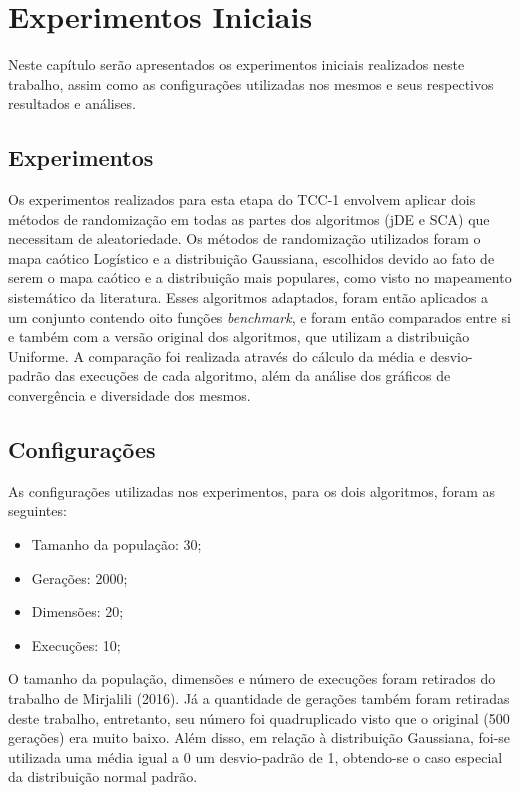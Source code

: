 \chapter{Experimentos Iniciais}

Neste capítulo serão apresentados os experimentos iniciais realizados neste trabalho, assim como as configurações utilizadas nos mesmos e seus respectivos resultados e análises.

\section{Experimentos}

Os experimentos realizados para esta etapa do TCC-1 envolvem aplicar dois métodos de randomização em todas as partes dos algoritmos (jDE e SCA) que necessitam de aleatoriedade. Os métodos de randomização utilizados foram o mapa caótico Logístico e a distribuição Gaussiana, escolhidos devido ao fato de serem o mapa caótico e a distribuição mais populares, como visto no mapeamento sistemático da literatura. Esses algoritmos adaptados, foram então aplicados a um conjunto contendo oito funções \textit{benchmark}, e foram então comparados entre si e também com a versão original dos algoritmos, que utilizam a distribuição Uniforme. A comparação foi realizada através do cálculo da média e desvio-padrão das execuções de cada algoritmo, além da análise dos gráficos de convergência e diversidade dos mesmos.

\section{Configurações}

As configurações utilizadas nos experimentos, para os dois algoritmos, foram as seguintes:

\begin{itemize}
    \item Tamanho da população: 30;
    \item Gerações: 2000;
    \item Dimensões: 20;
    \item Execuções: 10;
\end{itemize}


O tamanho da população, dimensões e número de execuções foram retirados do trabalho de Mirjalili (2016). Já a quantidade de gerações também foram retiradas deste trabalho, entretanto, seu número foi quadruplicado visto que o original (500 gerações) era muito baixo.  Além disso, em relação à distribuição Gaussiana, foi-se utilizada uma média igual a 0 um desvio-padrão de 1, obtendo-se o caso especial da distribuição normal padrão.

